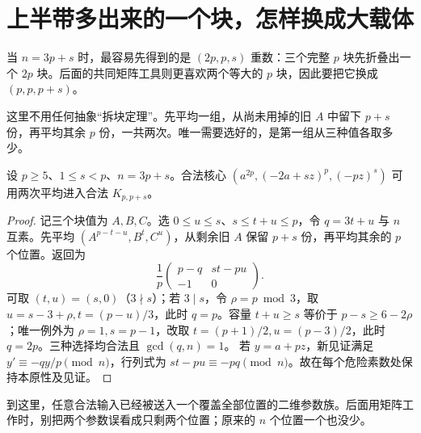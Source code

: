 \section{上半带多出来的一个块，怎样换成大载体}
当 $n=3p+s$ 时，最容易先得到的是 $(2p,p,s)$ 重数：三个完整 $p$ 块先折叠出一个 $2p$ 块。后面的共同矩阵工具则更喜欢两个等大的 $p$ 块，因此要把它换成 $(p,p,p+s)$。

这里不用任何抽象“拆块定理”。先平均一组，从尚未用掉的旧 $A$ 中留下 $p+s$ 份，再平均其余 $p$ 份，一共两次。唯一需要选好的，是第一组从三种值各取多少。
\begin{lemma}[用两次平均改换块重数]\label{lem:shape-change}
设 $p\ge5$、$1\le s<p$、$n=3p+s$。合法核心 $(a^{2p},(-2a+sz)^p,(-pz)^s)$ 可用两次平均进入合法 $K_{p,p+s}$。
\end{lemma}
\begin{proof}
记三个块值为 $A,B,C$。选 $0\le u\le s$、$s\le t+u\le p$，令 $q=3t+u$ 与 $n$ 互素。先平均 $(A^{p-t-u},B^t,C^u)$，从剩余旧 $A$ 保留 $p+s$ 份，再平均其余的 $p$ 个位置。返回为
\[
\frac1p\begin{pmatrix}p-q&st-pu\\-1&0\end{pmatrix}.
\]
可取 $(t,u)=(s,0)$（$3\nmid s$）；若 $3\mid s$，令 $\rho=p\bmod3$，取 $u=s-3+\rho,t=(p-u)/3$，此时 $q=p$。容量 $t+u\ge s$ 等价于 $p-s\ge6-2\rho$；唯一例外为 $\rho=1,s=p-1$，改取 $t=(p+1)/2,u=(p-3)/2$，此时 $q=2p$。三种选择均合法且 $\gcd(q,n)=1$。
若 $y=a+pz$，新见证满足 $y'\equiv-qy/p\pmod n$，行列式为 $st-pu\equiv-pq\pmod n$。故在每个危险素数处保持本原性及见证。
\end{proof}
到这里，任意合法输入已经被送入一个覆盖全部位置的二维参数族。后面用矩阵工作时，别把两个参数误看成只剩两个位置；原来的 $n$ 个位置一个也没少。
